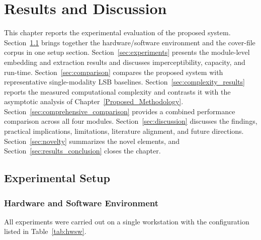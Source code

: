 \chapter{Results and Discussion}
\label{Experimental_results}

This chapter reports the experimental evaluation of the proposed system. Section~\ref{sec:experimental_setup} brings together the hardware/software environment and the cover-file corpus in one setup section. Section~\ref{sec:experiments} presents the module-level embedding and extraction results and discusses imperceptibility, capacity, and run-time. Section~\ref{sec:comparison} compares the proposed system with representative single-modality LSB baselines. Section~\ref{sec:complexity_results} reports the measured computational complexity and contrasts it with the asymptotic analysis of Chapter~\ref{Proposed_Methodology}. Section~\ref{sec:comprehensive_comparison} provides a combined performance comparison across all four modules. Section~\ref{sec:discussion} discusses the findings, practical implications, limitations, literature alignment, and future directions. Section~\ref{sec:novelty} summarizes the novel elements, and Section~\ref{sec:results_conclusion} closes the chapter.

\section{Experimental Setup}
\label{sec:experimental_setup}

\subsection{Hardware and Software Environment}
\label{sec:hwsw}

All experiments were carried out on a single workstation with the configuration listed in Table~\ref{tab:hwsw}.

